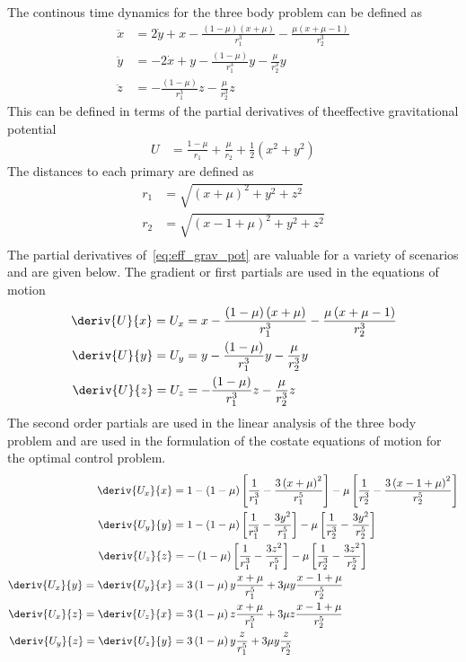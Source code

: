 The continous time dynamics for the three body problem can be defined as 
\begin{align}\label{eq:con_dyn}
	\ddot{x} &= 2\dot{y} + x - \frac{\left( 1-\mu\right) \left(x + \mu \right)}{r_1^3} - \frac{\mu\left( x + \mu - 1\right)}{r_2^3} \nonumber \\
	\ddot{y} &= -2 \dot{x} + y -\frac{\left( 1 - \mu \right)}{r_1^3} y - \frac{\mu }{r_2^3} y \nonumber \\
	\ddot{z} &= -\frac{\left( 1 - \mu\right)}{r_1^3}z - \frac{\mu}{r_2^3}z
\end{align}
This can be defined in terms of the partial derivatives of theeffective gravitational potential
\begin{align}\label{eq:eff_grav_pot}
	U &= \frac{1-\mu}{r_1} + \frac{\mu}{r_2} + \frac{1}{2} \left(x^2 + y ^2 \right)
\end{align}
The distances to each primary are defined as
\begin{align}\label{eq:dist}
	r_1 &= \sqrt{ \left( x+ \mu\right)^2 + y^2 + z^2} \\
	r_2 &= \sqrt{ \left( x -1 + \mu\right)^2 + y^2 + z^2} \\
\end{align}
The partial derivatives of~\cref{eq:eff_grav_pot} are valuable for a variety of scenarios and are given below.
The gradient or first partials are used in the equations of motion
\begin{align}\label{eq:first_partials}
	\deriv{U}{x} = U_{x} &= x - \frac{\left( 1-\mu\right) \left(x + \mu \right)}{r_1^3} - \frac{\mu\left( x + \mu - 1\right)}{r_2^3} \nonumber \\
	\deriv{U}{y} = U_{y} &= y -\frac{\left( 1 - \mu \right)}{r_1^3} y - \frac{\mu }{r_2^3} y \nonumber \\
	\deriv{U}{z} = U_{z} &= -\frac{\left( 1 - \mu\right)}{r_1^3}z - \frac{\mu}{r_2^3}z
\end{align}
The second order partials are used in the linear analysis of the three body problem and are used in the formulation of the costate equations of motion for the optimal control problem.
\begin{align}\label{eq:second_partials}
	\deriv{U_x}{x} &= 1 - \left( 1 - \mu \right) \left[ \frac{1}{r_1^3} - \frac{3 \left( x+\mu\right)^2}{r_1^5}\right] - \mu \left[ \frac{1}{r_2^3} - \frac{3 \left( x -1+ \mu\right)^2}{r_2^5} \right] \nonumber \\
	\deriv{U_y}{y} &= 1 - \left( 1 - \mu \right) \left[ \frac{1}{r_1^3} - \frac{3 y^2}{r_1^5}\right] - \mu \left[ \frac{1}{r_2^3} - \frac{3 y^2}{r_2^5} \right] \nonumber \\
	\deriv{U_z}{z} &= - \left( 1 - \mu \right) \left[ \frac{1}{r_1^3} - \frac{3 z^2}{r_1^5}\right] - \mu \left[ \frac{1}{r_2^3} - \frac{3 z^2}{r_2^5} \right] \nonumber \\
	\deriv{U_x}{y} = \deriv{U_y}{x} &= 3\left( 1 - \mu \right) y \frac{x+\mu}{r_1^5} + 3\mu y \frac{x -1 +\mu}{r_2^5} \\
	\deriv{U_x}{z} = \deriv{U_z}{x} &= 3\left( 1 - \mu \right) z \frac{x+\mu}{r_1^5} + 3\mu z \frac{x -1 +\mu}{r_2^5} \\
	\deriv{U_y}{z} = \deriv{U_z}{y} &= 3\left( 1 - \mu \right) y \frac{z}{r_1^5} + 3\mu y \frac{z}{r_2^5} 
\end{align}
